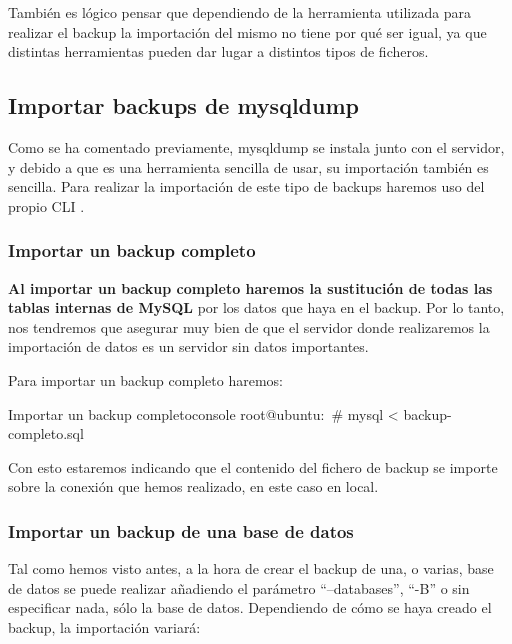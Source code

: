 También es lógico pensar que dependiendo de la herramienta utilizada para realizar el backup la importación del mismo no tiene por qué ser igual, ya que distintas herramientas pueden dar lugar a distintos tipos de ficheros.


\subsection{Importar backups de mysqldump}
Como se ha comentado previamente, mysqldump se instala junto con el servidor, y debido a que es una herramienta sencilla de usar, su importación también es sencilla. Para realizar la importación de este tipo de backups haremos uso del propio CLI  .


\subsubsection{Importar un backup completo}
\textbf{Al importar un backup completo haremos la sustitución de todas las tablas internas de MySQL} por los datos que haya en el backup. Por lo tanto, nos tendremos que asegurar muy bien de que el servidor donde realizaremos la importación de datos es un servidor sin datos importantes.

Para importar un backup completo haremos:

\begin{mycode}{Importar un backup completo}{console}{}
root@ubuntu:~# mysql < backup-completo.sql
\end{mycode}

Con esto estaremos indicando que el contenido del fichero de backup se importe sobre la conexión que hemos realizado, en este caso en local.


\subsubsection{Importar un backup de una base de datos}
Tal como hemos visto antes, a la hora de crear el backup de una, o varias, base de datos se puede realizar añadiendo el parámetro “--databases”,  “-B” o sin especificar nada, sólo la base de datos. Dependiendo de cómo se haya creado el backup, la importación variará:

